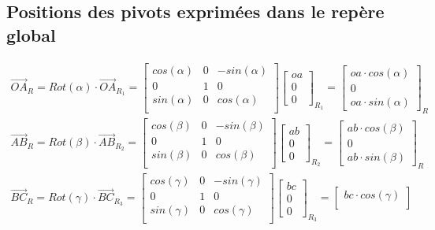 \documentclass[12pt,a4paper]{article}
\begin{document}
\subsection{Positions des pivots exprimées dans le repère global}
\begin{eqnarray}
\vec{OA}_R=Rot(\alpha) \cdot \vec{OA}_{R_1}=
\begin{bmatrix}
cos(\alpha) & 0 &-sin(\alpha)\\
0 & 1 & 0 \\
sin(\alpha) & 0 & cos(\alpha) \\
\end{bmatrix}
\begin{bmatrix}
oa \\
0\\
0
\end{bmatrix}_{R_1} =
\begin{bmatrix}
oa \cdot cos(\alpha) \\
0\\
oa \cdot sin(\alpha) 
\end{bmatrix}_{R}
\\
\vec{AB}_R=Rot(\beta) \cdot \vec{AB}_{R_2}=
\begin{bmatrix}
cos(\beta) & 0 &-sin(\beta)\\
0 & 1 & 0 \\
sin(\beta) & 0 & cos(\beta) \\
\end{bmatrix}
\begin{bmatrix}
ab \\
0\\
0
\end{bmatrix}_{R_2}=
\begin{bmatrix}
ab \cdot cos(\beta) \\
0\\
ab \cdot sin(\beta) 
\end{bmatrix}_{R}
\\
\vec{BC}_R =Rot(\gamma) \cdot \vec{ BC}_{R_3}=
\begin{bmatrix}
cos(\gamma) & 0 &-sin(\gamma)\\
0 & 1 & 0 \\
sin(\gamma) & 0 & cos(\gamma) \\
\end{bmatrix}
\begin{bmatrix}
bc \\
0\\
0
\end{bmatrix}_{R_3}=
\begin{bmatrix}
bc \cdot cos(\gamma) \\

\end{bmatrix}
\end{eqnarray}
\end{document}
